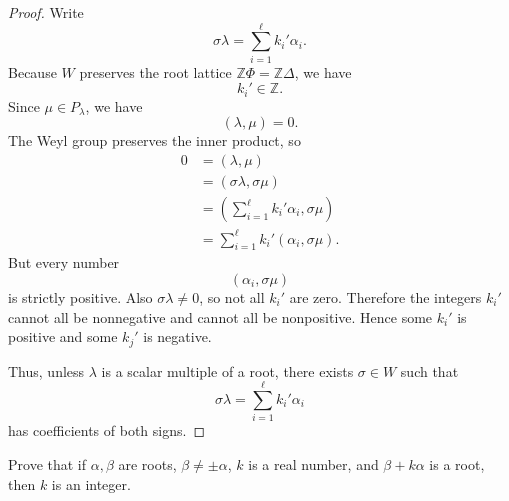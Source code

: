 \begin{proof}
    Write
    \[
        \sigma\lambda=\sum_{i=1}^{\ell}k_i'\alpha_i.
    \]
    Because \(W\) preserves the root lattice \(\mathbb Z\Phi=\mathbb Z\Delta\),
    we have
    \[
        k_i'\in\mathbb Z.
    \]
    Since \(\mu\in P_\lambda\), we have
    \[
        (\lambda,\mu)=0.
    \]
    The Weyl group preserves the inner product, so
    \[
    \begin{aligned}
        0
        &=
        (\lambda,\mu)                                                   \\
        &=
        (\sigma\lambda,\sigma\mu)                                       \\
        &=
        \left(\sum_{i=1}^{\ell}k_i'\alpha_i,\sigma\mu\right)             \\
        &=
        \sum_{i=1}^{\ell}k_i'(\alpha_i,\sigma\mu).
    \end{aligned}
    \]
    But every number
    \[
        (\alpha_i,\sigma\mu)
    \]
    is strictly positive. Also \(\sigma\lambda\neq 0\), so not all \(k_i'\) are zero.
    Therefore the integers \(k_i'\) cannot all be nonnegative and cannot all be
    nonpositive. Hence some \(k_i'\) is positive and some \(k_j'\) is negative.
    
    Thus, unless \(\lambda\) is a scalar multiple of a root, there exists
    \(\sigma\in W\) such that
    \[
        \sigma\lambda=\sum_{i=1}^{\ell}k_i'\alpha_i
    \]
    has coefficients of both signs.
    \end{proof}

\begin{exercise}
    Prove that if \(\alpha,\beta\) are roots, \(\beta\neq\pm\alpha\), \(k\) is a real number, and \(\beta+k\alpha\) is a root, then \(k\) is an integer.
\end{exercise}

